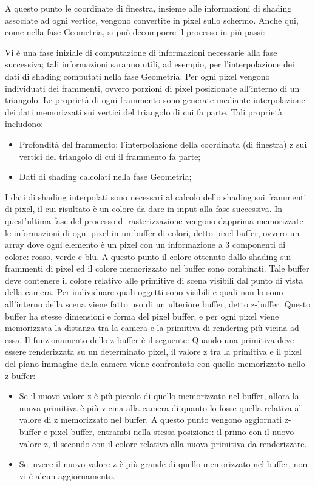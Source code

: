 A questo punto le coordinate di finestra, insieme alle informazioni di shading associate ad ogni vertice, vengono convertite in pixel sullo schermo. Anche qui, come nella fase Geometria, si può decomporre il processo in più passi:

Vi è una fase iniziale di computazione di informazioni necessarie alla fase successiva; tali informazioni saranno utili, ad esempio, per l’interpolazione dei dati di shading computati nella fase Geometria.
Per ogni pixel vengono individuati dei frammenti, ovvero porzioni di pixel posizionate all’interno di un triangolo. Le proprietà di ogni frammento sono generate mediante interpolazione dei dati memorizzati sui vertici del triangolo di cui fa parte. 
Tali proprietà includono:

\begin{itemize}
\item Profondità del frammento: l’interpolazione della coordinata (di finestra) z sui vertici del triangolo di cui il frammento fa parte;
\item Dati di shading calcolati nella fase Geometria;
\end{itemize}

I dati di shading interpolati sono necessari al calcolo dello shading sui frammenti di pixel, il cui risultato è un colore da dare in input alla fase successiva.
In quest’ultima fase del processo di rasterizzazione vengono dapprima memorizzate le informazioni di ogni pixel in un buffer di colori, detto pixel buffer, ovvero un array dove ogni elemento è un pixel con un informazione a 3 componenti di colore: rosso, verde e blu.
A questo punto il colore ottenuto dallo shading sui frammenti di pixel ed il colore memorizzato nel buffer sono combinati.
Tale buffer deve contenere il colore relativo alle primitive di scena visibili dal punto di vista della camera. 
Per individuare quali oggetti sono visibili e quali non lo sono all’interno della scena viene fatto uso di un ulteriore buffer, detto z-buffer. Questo buffer ha stesse dimensioni e forma del pixel buffer, e per ogni pixel viene memorizzata la distanza tra la camera e la primitiva di rendering più vicina ad essa. Il funzionamento dello z-buffer è il seguente: 
Quando una primitiva deve essere renderizzata su un determinato pixel, il valore z tra la primitiva e il pixel del piano immagine della camera viene confrontato con quello memorizzato nello z buffer:

\begin{itemize}
\item Se il nuovo valore z è più piccolo di quello memorizzato nel buffer, allora la nuova primitiva è più vicina alla camera di quanto lo fosse quella relativa al valore di z memorizzato nel buffer. A questo punto vengono aggiornati z-buffer e pixel buffer, entrambi nella stessa posizione: il primo con il nuovo valore z, il secondo con il colore relativo alla nuova primitiva da renderizzare. 
\item Se invece il nuovo valore z è più grande di quello memorizzato nel buffer, non vi è alcun aggiornamento.
\end{itemize}

